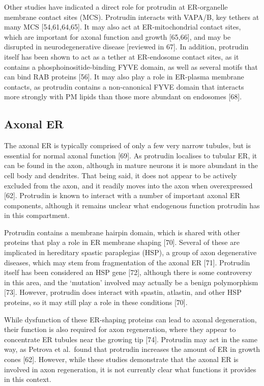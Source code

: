 \documentclass[
  12pt,
  a4paper,
]{book}
\begin{document}
Other studies have indicated a direct role for protrudin at ER-organelle membrane contact sites (MCS). Protrudin interacts with VAPA/B, key tethers at many MCS {[}54,61,64,65{]}. It may also act at ER-mitochondrial contact sites, which are important for axonal function and growth {[}65,66{]}, and may be disrupted in neurodegenerative disease {[}reviewed in 67{]}. In addition, protrudin itself has been shown to act as a tether at ER-endosome contact sites, as it contains a phosphoinositide-binding FYVE domain, as well as several motifs that can bind RAB proteins {[}56{]}. It may also play a role in ER-plasma membrane contacts, as protrudin contains a non-canonical FYVE domain that interacts more strongly with PM lipids than those more abundant on endosomes {[}68{]}.

\subsection{Axonal ER}\label{intro-ptdn-axonalER}

The axonal ER is typically comprised of only a few very narrow tubules, but is essential for normal axonal function {[}69{]}. As protrudin localises to tubular ER, it can be found in the axon, although in mature neurons it is more abundant in the cell body and dendrites. That being said, it does not appear to be actively excluded from the axon, and it readily moves into the axon when overexpressed {[}62{]}. Protrudin is known to interact with a number of important axonal ER components, although it remains unclear what endogenous function protrudin has in this compartment.

Protrudin contains a membrane hairpin domain, which is shared with other proteins that play a role in ER membrane shaping {[}70{]}. Several of these are implicated in hereditary spastic paraplegias (HSP), a group of axon degenerative diseases, which may stem from fragmentation of the axonal ER {[}71{]}. Protrudin itself has been considered an HSP gene {[}72{]}, although there is some controversy in this area, and the `mutation' involved may actually be a benign polymorphism {[}73{]}. However, protrudin does interact with spastin, atlastin, and other HSP proteins, so it may still play a role in these conditions {[}70{]}.

While dysfunction of these ER-shaping proteins can lead to axonal degeneration, their function is also required for axon regeneration, where they appear to concentrate ER tubules near the growing tip {[}74{]}. Protrudin may act in the same way, as Petrova et al.~found that protrudin increases the amount of ER in growth cones {[}62{]}. However, while these studies demonstrate that the axonal ER is involved in axon regeneration, it is not currently clear what functions it provides in this context.
\end{document}

